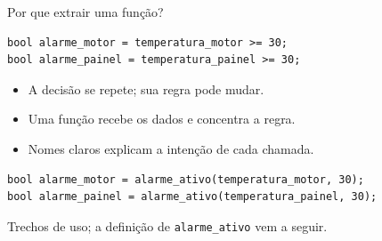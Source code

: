 \begin{frame}[fragile]{Por que extrair uma função?}
\begin{lstlisting}
bool alarme_motor = temperatura_motor >= 30;
bool alarme_painel = temperatura_painel >= 30;
\end{lstlisting}
\begin{itemize}
\item A decisão se repete; sua regra pode mudar.
\item Uma função recebe os dados e concentra a regra.
\item Nomes claros explicam a intenção de cada chamada.
\end{itemize}
\begin{lstlisting}
bool alarme_motor = alarme_ativo(temperatura_motor, 30);
bool alarme_painel = alarme_ativo(temperatura_painel, 30);
\end{lstlisting}
\small Trechos de uso; a definição de \texttt{alarme\_ativo} vem a seguir.
\end{frame}
